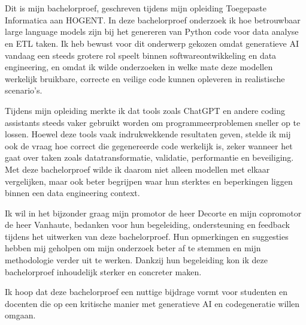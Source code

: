 
\chapter*{}%
\label{ch:voorwoord}


Dit is mijn bachelorproef, geschreven tijdens mijn opleiding Toegepaste Informatica aan HOGENT. In deze bachelorproef onderzoek ik hoe betrouwbaar large language models zijn bij het genereren van Python code voor data analyse en ETL taken. Ik heb bewust voor dit onderwerp gekozen omdat generatieve AI vandaag een steeds grotere rol speelt binnen softwareontwikkeling en data engineering, en omdat ik wilde onderzoeken in welke mate deze modellen werkelijk bruikbare, correcte en veilige code kunnen opleveren in realistische scenario's.

Tijdens mijn opleiding merkte ik dat tools zoals ChatGPT en andere coding assistants steeds vaker gebruikt worden om programmeerproblemen sneller op te lossen. Hoewel deze tools vaak indrukwekkende resultaten geven, stelde ik mij ook de vraag hoe correct die gegenereerde code werkelijk is, zeker wanneer het gaat over taken zoals datatransformatie, validatie, performantie en beveiliging. Met deze bachelorproef wilde ik daarom niet alleen modellen met elkaar vergelijken, maar ook beter begrijpen waar hun sterktes en beperkingen liggen binnen een data engineering context.

Ik wil in het bijzonder graag mijn promotor de heer Decorte en mijn copromotor de heer Vanhaute, bedanken voor hun begeleiding, ondersteuning en feedback tijdens het uitwerken van deze bachelorproef. Hun opmerkingen en suggesties hebben mij geholpen om mijn onderzoek beter af te stemmen en mijn methodologie verder uit te werken. Dankzij hun begeleiding kon ik deze bachelorproef inhoudelijk sterker en concreter maken.

Ik hoop dat deze bachelorproef een nuttige bijdrage vormt voor studenten en docenten die op een kritische manier met generatieve AI en codegeneratie willen omgaan.